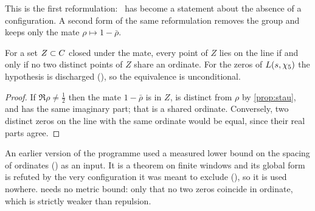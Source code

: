 This is the first reformulation: \Ecore\ has become a statement about the absence of a configuration. A second form of the same reformulation removes the group and keeps
only the mate $\rho\mapsto1-\bar\rho$.

\begin{theorem}\label{thm:shared-ordinate}
For a set $Z\subset C$ closed under the mate, every point of $Z$ lies on the line
if and only if no two distinct points of $Z$ share an ordinate.  For the zeros of
$L(s,\chi_5)$ the hypothesis is discharged
(), so the equivalence is unconditional.
%
\end{theorem}
\begin{proof}
If $\Re\rho\ne\tfrac12$ then the mate $1-\bar\rho$ is in $Z$, is distinct from
$\rho$ by \cref{prop:stau}, and has the same imaginary part; that is a shared
ordinate.  Conversely, two distinct zeros on the line with the same ordinate
would be equal, since their real parts agree.
\end{proof}

\begin{remark}
An earlier version of the programme used a measured lower bound on the spacing of
ordinates () as an input.  It is a theorem on finite
windows and its global form is refuted by the very configuration it was meant to
exclude (), so it is
used nowhere.   needs no metric bound: only that no two
zeros coincide in ordinate, which is strictly weaker than repulsion.
\end{remark}

